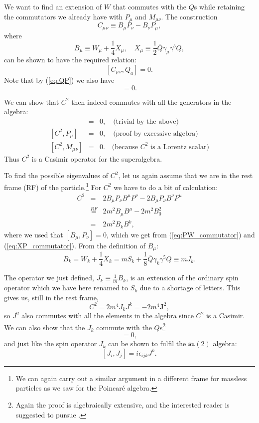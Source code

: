 \documentclass[notes.tex]{subfiles}
\begin{document}
We want to find an extension of $W$ that commutes with the $Q$s while retaining the commutators we already have with $P_\mu$ and $M_{\mu\nu}$. The construction
\[C_\mu{}_\nu \equiv B_\mu P_\nu - B_\nu P_\mu,\]
where
\[B_\mu \equiv W_\mu + \frac{1}{4} X_\mu,\quad X_\mu \equiv \frac{1}{2} \bar{Q}\gamma_\mu \gamma^5 Q,\]
can be shown to have the required relation:
\[[C_\mu{}_\nu, Q_a] = 0.\]
Note that by (\ref{eq:QP}) we also have 
\begin{equation}
[X_\mu,P_\nu]=0.
\label{eq:XP_commutator}
\end{equation}

We can show that $C^2$ then indeed commutes with all the generators in the algebra:
\begin{eqnarray*}
[C^2, Q_a] &=& 0, \quad\text{(trivial by the above)}\\
{}[C^2, P_\mu] &=& 0, \quad\text{(proof by excessive algebra)}\\
{}[C^2, M_\mu{}_\nu] &=& 0. \quad\text{(because $C^2$ is a Lorentz scalar)}
\end{eqnarray*}
Thus $C^2$ is a Casimir operator for the superalgebra.

To find the possible eigenvalues of $C^2$, let us again assume that we are in the rest frame (RF) of the particle.\footnote{We can again carry out a similar argument in a different frame for massless particles as we saw for the Poincaré algebra.} For $C^2$ we have to do a bit of calculation:
\begin{eqnarray*}
C^2 &=& 2B_\mu P_\nu B^\mu P^\nu - 2B_\mu P_\nu B^\nu P^\mu\\
&\stackrel{RF}{=}& 2m^2 B_\mu B^\mu - 2m^2 B_0^2\\
&=& 2m^2 B_k B^k,
\end{eqnarray*}
where we used that $[B_\mu,P_\nu]=0$, which we get from  (\ref{eq:PW_commutator}) and (\ref{eq:XP_commutator}). From the definition of $B_\mu$:
\begin{equation}
B_k = W_k + \frac{1}{4}X_k = mS_k + \frac{1}{8}\bar{Q}\gamma_k \gamma^5 Q \equiv m J_k.
\end{equation}

The operator we just defined, $J_k \equiv \frac{1}{m} B_k$, is an extension of the ordinary spin operator which we have here renamed to $S_k$ due to a shortage of letters. This gives us, still in the rest frame,
\[C^2 = 2m^4 J_k J^k= -2m^4 \mathbf J^2,\]
so $J^2$ also commutes with all the elements in the algebra since $C^2$ is a Casimir. We can also show that the $J_k$ commute with the $Q$s\footnote{Again the proof is algebraically extensive, and  the interested reader is suggested to pursue \cite{IntrSUSY2010}.}
\begin{equation}
[J_k,Q_a]=0,
\label{eq:JQ}
\end{equation} 
and just like the spin operator $J_k$ can be shown to fulfil the  $\mathfrak{su}(2)$ algebra:
\[[J_i, J_j] = i\epsilon_{ijk}J^k.\]
\end{document}
